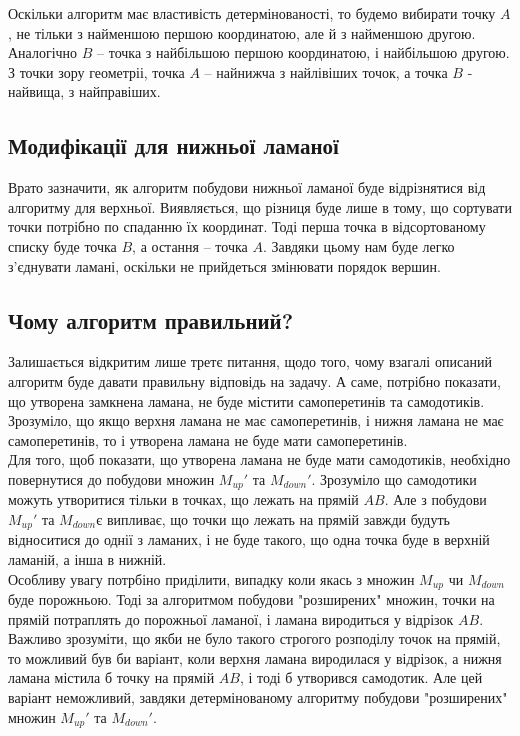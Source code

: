 \documentclass[a4paper,12pt,titlepage]{article}
\begin{document}
Оскільки алгоритм має властивість детермінованості, то будемо вибирати точку $A$, не тільки з найменшою першою координатою, але й з найменшою другою. Аналогічно $B$ -- точка з найбільшою першою координатою, і найбільшою другою. З точки зору геометріі, точка $A$ -- найнижча з найлівіших точок, а точка $B$ - найвища, з найправіших.\\

\subsection{Модифікації для нижньої ламаної}

Врато зазначити, як алгоритм побудови нижньої ламаної буде відрізнятися від алгоритму для верхньої. Виявляється, що різниця буде лише в тому, що сортувати точки потрібно по спаданню їх координат. Тоді перша точка в відсортованому списку буде точка $B$, а остання -- точка $A$. Завдяки цьому нам буде легко з'єднувати ламані, оскільки не прийдеться змінювати порядок вершин.\\

\subsection{Чому алгоритм правильний?}

Залишається відкритим лише третє питання, щодо того, чому взагалі описаний алгоритм буде давати правильну відповідь на задачу. А саме, потрібно показати, що утворена замкнена ламана, не буде містити самоперетинів та самодотиків. Зрозуміло, що якщо верхня ламана не має самоперетинів, і нижня ламана не має самоперетинів, то і утворена ламана не буде мати самоперетинів.\\

Для того, щоб показати, що утворена ламана не буде мати самодотиків, необхідно повернутися до побудови множин $M_{up}'$ та $M_{down}'$. Зрозуміло що самодотики можуть утворитися тільки в точках, що лежать на прямій $AB$. Але з побудови $M_{up}'$ та $M_{down}є$ випливає, що точки що лежать на прямій завжди будуть відноситися до однії з ламаних, і не буде такого, що одна точка буде в верхній ламаній, а інша в нижній.\\

Особливу увагу потрбіно приділити, випадку коли якась з множин $M_{up}$ чи $M_{down}$ буде порожньою. Тоді за алгоритмом побудови "розширених" множин, точки на прямій потраплять до порожньої ламаної, і ламана виродиться у відрізок $AB$. Важливо зрозуміти, що якби не було такого строгого розподілу точок на прямій, то можливий був би варіант, коли верхня ламана виродилася у відрізок, а нижня ламана містила б точку на прямій $AB$, і тоді б утворився самодотик. Але цей варіант неможливий, завдяки детермінованому алгоритму побудови "розширених" множин $M_{up}'$ та $M_{down}'$.
\end{document}
